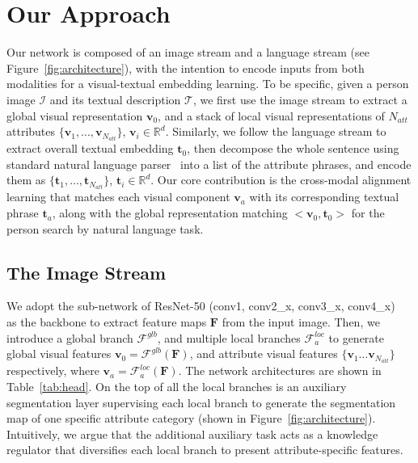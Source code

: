 \documentclass[runningheads]{llncs}
\begin{document}
\section{Our Approach}
Our network is composed of an image stream and a language stream (see Figure~\ref{fig:architecture}), with the intention to encode inputs from both modalities for a visual-textual embedding learning. To be specific, given a person image $\mathcal{I}$ and its textual description $\mathcal{T}$, we first use the image stream to extract a global visual representation $\boldsymbol{v}_0$, and a stack of local visual representations of $N_{att}$ attributes $\{\boldsymbol{v}_1, ... ,\boldsymbol{v}_{N_{att}}\}$, $\boldsymbol{v}_i\in \mathbb{R}^{d}$.
Similarly, we follow the language stream to extract overall textual embedding $\boldsymbol{t}_0$,
then decompose the whole sentence using standard natural language parser~\cite{klein2003fast} into a list of the attribute phrases, and encode them as $\{\boldsymbol{t}_1, ... ,\boldsymbol{t}_{N_{att}}\}$, $\boldsymbol{t}_i\in\mathbb{R}^d$. Our core contribution is the cross-modal alignment learning that matches each visual component $\boldsymbol{v}_a$ with its corresponding textual phrase $\boldsymbol{t}_a$, along with the global representation matching $\big<\boldsymbol{v}_0, \boldsymbol{t}_0\big>$ for the person search by natural language task. 

\subsection{The Image Stream}
We adopt the sub-network of ResNet-50 (conv1, conv2\_x, conv3\_x, conv4\_x)~\cite{he2016deep} as the backbone to extract feature maps $\boldsymbol{F}$ from the input image. Then, we introduce a global branch $\mathcal{F}^{glb}$, and multiple local branches $\mathcal{F}^{loc}_{a}$ to generate global visual features $\boldsymbol{v}_{0} = \mathcal{F}^{glb}(\boldsymbol{F})$, 
and attribute visual features $\{\boldsymbol{v}_{1}\dots\boldsymbol{v}_{N_{att}}\}$ respectively, where $\boldsymbol{v}_{a} = \mathcal{F}^{loc}_{a}(\boldsymbol{F})$. The network architectures are shown in Table~\ref{tab:head}. 
On the top of all the local branches is an auxiliary segmentation layer supervising each local branch to generate the segmentation map of one specific attribute category (shown in Figure~\ref{fig:architecture}). 
Intuitively, we argue that the additional auxiliary task acts as a knowledge regulator that diversifies each local branch to present attribute-specific features.
\end{document}
